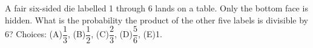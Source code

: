 A fair six-sided die labelled 1 through 6 lands on a table. Only the bottom face is hidden. What is the probability the product of the other five labels is divisible by 6? Choices: (A)$\dfrac{1}{3}$, (B)$\dfrac{1}{2}$, (C)$\dfrac{2}{3}$, (D)$\dfrac{5}{6}$, (E)1.
